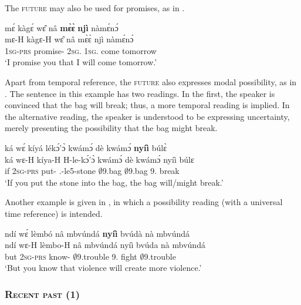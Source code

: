 \noindent The \textsc{future} may also be used for promises, as in .

\ea\label{futpromise}
  \glll  mɛ́ kàgɛ́ wɛ̂ nâ {\bfseries mɛ̀ɛ̀} {\bfseries njì} nàmɛ́nɔ́ \\
         mɛ-H kàgɛ-H wɛ̂ nâ mɛ̀ɛ̀ njì nàmɛ́nɔ́ \\
           1\textsc{sg}-\textsc{prs} promise-{\R} 2\textsc{sg}.{\OBJ} {\COMP} 1\textsc{sg}.{\FUT} come tomorrow\\
    \trans `I promise you that I will come tomorrow.'
\z


Apart from temporal reference, the \textsc{future} also expresses modal possibility, as in . The sentence in this example has two readings. In the first, the speaker is convinced that the bag will break; thus, a more temporal reading is implied. In the alternative reading, the speaker is understood to be expressing uncertainty, merely presenting the possibility that the bag might break.

\ea\label{futposs}
  \glll  ká wɛ́ kíyá lékɔ́'ɔ̀ kwámɔ́ dè kwámɔ́ {\bfseries nyíì} búlɛ̀ \\
         ká wɛ-H kíya-H H-le-kɔ́'ɔ̀ kwámɔ́ dè kwámɔ́ nyíì búlɛ \\
           if 2\textsc{sg}-\textsc{prs} put-{\R} {\OBJ}.{\LINK}-le5-stone $\emptyset$9.bag {\LOC} $\emptyset$9.bag 9.{\FUT} break\\
    \trans `If you put the stone into the bag, the bag will/might break.'
\z

\noindent Another example is given in , in which a possibility reading (with a universal time reference) is intended.

\ea\label{Possibility}
  \glll ndí wɛ́ lèmbó nâ mbvúndá {\bfseries nyíì} bvúdà nà mbvúndá \\
        ndí wɛ-H lèmbo-H nâ mbvúndá nyíì bvúda nà mbvúndá \\
         but 2\textsc{sg}-\textsc{prs} know-{\R} {\COMP} $\emptyset$9.trouble 9.{\FUT} fight {\COM} $\emptyset$9.trouble\\
    \trans `But you know that violence will create more violence.'
\z





\subsubsection{\textsc{Recent past ({\PST}1)}}
\label{sec:pst1}

